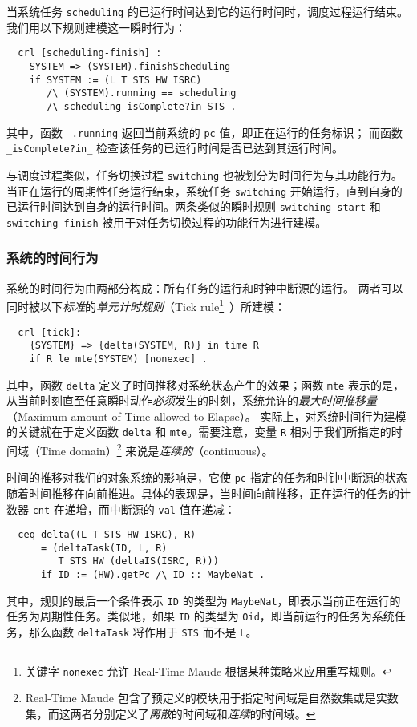 当系统任务 \verb|scheduling| 的已运行时间达到它的运行时间时，调度过程运行结束。我们用以下规则建模这一瞬时行为：
\begin{verbatim}
  crl [scheduling-finish] :
    SYSTEM => (SYSTEM).finishScheduling
    if SYSTEM := (L T STS HW ISRC) 
       /\ (SYSTEM).running == scheduling 
       /\ scheduling isComplete?in STS .
\end{verbatim}
其中，函数 \verb|_.running| 返回当前系统的 \verb|pc| 值，即正在运行的任务标识；
而函数 \verb|_isComplete?in_| 检查该任务的已运行时间是否已达到其运行时间。

与调度过程类似，任务切换过程 \verb|switching| 也被划分为时间行为与其功能行为。当正在运行的周期性任务运行结束，系统任务 \verb|switching| 开始运行，直到自身的已运行时间达到自身的运行时间。两条类似的瞬时规则 \verb|switching-start| 和 \verb|switching-finish| 被用于对任务切换过程的功能行为进行建模。


\subsubsection{系统的时间行为}
\label{ss:timedbehavior}
系统的时间行为由两部分构成：所有任务的运行和时钟中断源的运行。
两者可以同时被以下\emph{标准}的\emph{单元计时规则}（Tick rule\footnote{关键字 \texttt{nonexec} 允许 Real-Time Maude 根据某种策略来应用重写规则。}~\cite{DBLP:journals/entcs/OlveczkyM07a}）所建模：
\begin{verbatim}
  crl [tick]:
    {SYSTEM} => {delta(SYSTEM, R)} in time R 
    if R le mte(SYSTEM) [nonexec] .
\end{verbatim}
其中，函数 \verb|delta| 定义了时间推移对系统状态产生的效果；函数
\verb|mte| 表示的是，从当前时刻直至任意瞬时动作\emph{必须}发生的时刻，系统允许的\emph{最大时间推移量} （Maximum amount of Time allowed to Elapse）。 
实际上，对系统时间行为建模的关键就在于定义函数 \verb|delta| 和 \verb|mte|。需要注意，变量 \verb|R| 相对于我们所指定的时间域（Time domain）\footnote{Real-Time Maude 包含了预定义的模块用于指定时间域是自然数集或是实数集，而这两者分别定义了\emph{离散}的时间域和\emph{连续}的时间域。} 来说是\emph{连续的}（continuous）。

时间的推移对我们的对象系统的影响是，它使 \verb|pc| 指定的任务和时钟中断源的状态随着时间推移在向前推进。具体的表现是，当时间向前推移，正在运行的任务的计数器 
 \verb|cnt| 在递增，而中断源的 \verb|val| 值在递减：
\begin{verbatim}
  ceq delta((L T STS HW ISRC), R)
      = (deltaTask(ID, L, R) 
         T STS HW (deltaIS(ISRC, R)))
      if ID := (HW).getPc /\ ID :: MaybeNat .
\end{verbatim}
其中，规则的最后一个条件表示 \verb|ID| 的类型为 \verb|MaybeNat|，即表示当前正在运行的任务为周期性任务。类似地，如果 \verb|ID| 的类型为 \verb|Oid|，即当前运行的任务为系统任务，那么函数 \verb|deltaTask| 将作用于 \verb|STS| 而不是 \verb|L|。

